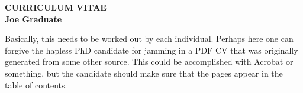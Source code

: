 
\thispagestyle{empty}

\begin{center}
{\LARGE {\bf CURRICULUM VITAE}}\\
\vspace{0.5in}
{\large {\bf Joe Graduate}}
\end{center}

Basically, this needs to be worked out by each individual. Perhaps
here one can forgive the hapless PhD candidate for jamming in a PDF CV
that was originally generated from some other source. This could be
accomplished with Acrobat or something, but the candidate should make
sure that the pages appear in the table of contents.
